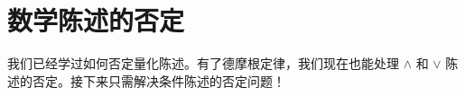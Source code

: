 \section{数学陈述的否定}\label{sec:section4.7}

我们已经学过如何否定量化陈述。有了德摩根定律，我们现在也能处理 $\land$ 和 $\lor$ 陈述的否定。接下来只需解决条件陈述的否定问题！






